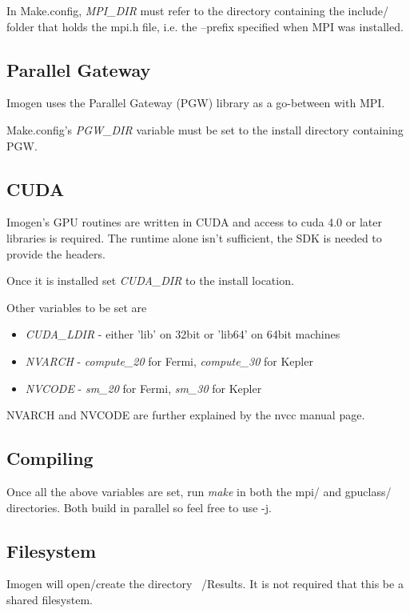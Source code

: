 \documentclass[letterpaper,12pt,twocolumn]{article}
\begin{document}
In Make.config, \textit{MPI\_DIR} must refer to the directory containing the include/ folder
that holds the mpi.h file, i.e. the --prefix specified when MPI was installed.

\subsection{Parallel Gateway}

Imogen uses the Parallel Gateway (PGW) library as a go-between with MPI.

Make.config's \textit{PGW\_DIR} variable must be set to the install directory
containing PGW.

\subsection{CUDA}

Imogen's GPU routines are written in CUDA and access to cuda 4.0 or later
libraries is required. The runtime alone isn't sufficient, the SDK is
needed to provide the headers.

Once it is installed set \textit{CUDA\_DIR} to the install location.

Other variables to be set are
\begin{itemize}
\item \textit{CUDA\_LDIR} - either 'lib' on 32bit or 'lib64' on 64bit machines
\item \textit{NVARCH} - \textit{compute\_20} for Fermi, \textit{compute\_30} for Kepler
\item \textit{NVCODE} - \textit{sm\_20} for Fermi, \textit{sm\_30} for Kepler
\end{itemize}

NVARCH and NVCODE are further explained by the nvcc manual page.

\subsection{Compiling}

Once all the above variables are set, run \textit{make} in both the mpi/ and gpuclass/
directories. Both build in parallel so feel free to use -j. 

\subsection{Filesystem}

Imogen will open/create the directory ~/Results. It is not required that this
be a shared filesystem.
\end{document}
